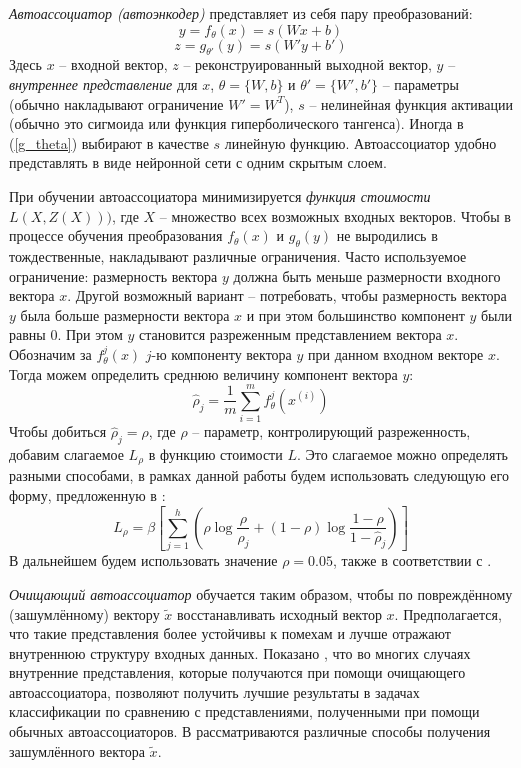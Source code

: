 \emph{Автоассоциатор (автоэнкодер)} представляет из себя пару преобразований:
\begin{equation}
y = f_{\theta}(x) = s(Wx+b)
\end{equation}
\begin{equation} \label{g_theta}
z=g_{\theta'}(y) = s(W'y+b')
\end{equation}
Здесь $x$ -- входной вектор, $z$ -- реконструированный выходной вектор, $y$ --
\emph{внутреннее представление} для $x$, $\theta = \{W,b\}$ и
$\theta'=\{W',b'\}$ -- параметры (обычно накладывают ограничение $W'=W^T$), $s$
-- нелинейная функция активации (обычно это сигмоида или функция
гиперболического тангенса). Иногда в (\ref{g_theta}) выбирают в качестве $s$
линейную функцию. Автоассоциатор удобно представлять в виде нейронной сети с
одним скрытым слоем.

При обучении автоассоциатора минимизируется \emph{функция стоимости} $L(X,
Z(X)))$, где $X$ -- множество всех возможных входных векторов. Чтобы в процессе
обучения преобразования $f_{\theta}(x)$ и $g_{\theta}(y)$ не выродились в
тождественные, накладывают различные ограничения. Часто используемое
ограничение: размерность вектора $y$ должна быть меньше размерности входного
вектора $x$. Другой возможный вариант -- потребовать, чтобы размерность вектора
$y$ была больше размерности вектора $x$ и при этом большинство компонент $y$
были равны 0. При этом $y$ становится разреженным представлением вектора $x$.
Обозначим за $f_{\theta}^j(x)$ $j$-ю компоненту вектора $y$ при данном входном
векторе $x$. Тогда можем определить среднюю величину компонент вектора $y$:
\begin{equation}
\hat{\rho}_j = \frac{1}{m} \sum_{i=1}^m f_{\theta}^j(x^{(i)})
\end{equation}
Чтобы добиться $\hat{\rho}_j = \rho$, где $\rho$ -- параметр, контролирующий
разреженность, добавим слагаемое $L_{\rho}$ в функцию стоимости $L$. Это
слагаемое можно определять разными способами, в рамках данной работы будем
использовать следующую его форму, предложенную в \cite{NgCS294A}:
\begin{equation}
L_{\rho} = \beta \left[ \sum_{j=1}^h \left( \rho \log \frac{\rho}{\hat{\rho}_j} +
(1 - \rho) \log \frac{1 - \rho}{1 - \hat{\rho}_j} \right) \right]
\end{equation}
В дальнейшем будем использовать значение $\rho=0.05$, также в соответствии с
\cite{NgCS294A}.

\emph{Очищающий автоассоциатор} обучается таким образом, чтобы по повреждённому
(зашумлённому) вектору $\tilde{x}$ восстанавливать исходный вектор $x$.
Предполагается, что такие представления более устойчивы к помехам и лучше
отражают внутреннюю структуру входных данных. Показано \cite{Vincent2010}, что
во многих случаях внутренние представления, которые получаются при помощи
очищающего автоассоциатора, позволяют получить лучшие результаты в задачах
классификации по сравнению с представлениями, полученными при помощи обычных
автоассоциаторов. В \cite{Vincent2010} рассматриваются различные способы
получения зашумлённого вектора $\tilde{x}$.


